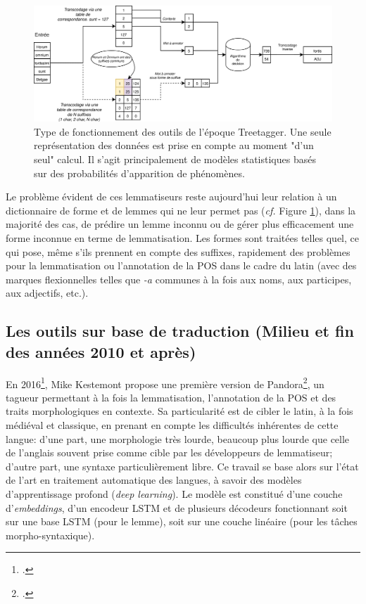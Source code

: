 \begin{figure}[h]
    \centering
    \includegraphics[width=\linewidth]{results/lemmatisation/outils/treetagger_type.png}
    \caption{Type de fonctionnement des outils de l'époque Treetagger. Une seule représentation des données est prise en compte au moment "d'un seul" calcul. Il s'agit principalement de modèles statistiques basés sur des probabilités d'apparition de phénomènes.}
    \label{lemmatisation:outils:type-treetagger}
\end{figure}

Le problème évident de ces lemmatiseurs reste aujourd'hui leur relation à un dictionnaire de forme et de lemmes qui ne leur permet pas (\textit{cf.} Figure \ref{lemmatisation:outils:type-treetagger}), dans la majorité des cas, de prédire un lemme inconnu ou de gérer plus efficacement une forme inconnue en terme de lemmatisation. Les formes sont traitées telles quel, ce qui pose, même s'ils prennent en compte des suffixes, rapidement des problèmes pour la lemmatisation ou l'annotation  de la POS dans le cadre du latin (avec des marques flexionnelles telles que \textit{-a} communes à la fois aux noms, aux participes, aux adjectifs, etc.).%

\subsection{Les outils sur base de traduction (Milieu et fin des années 2010 et après)}

En 2016\footcite{kestemont_initial_2016}, Mike Kestemont propose une première version de Pandora\footcite{kestemont_lemmatization_2017}, un tagueur permettant à la fois la lemmatisation, l'annotation de la POS et des traits morphologiques en contexte. Sa particularité est de cibler le latin, à la fois médiéval et classique, en prenant en compte les difficultés inhérentes de cette langue: d'une part, une morphologie très lourde, beaucoup plus lourde que celle de l'anglais souvent prise comme cible par les développeurs de lemmatiseur; d'autre part, une syntaxe particulièrement libre. Ce travail se base alors sur l'état de l'art en traitement automatique des langues, à savoir des modèles d'apprentissage profond (\textit{deep learning}). Le modèle est constitué d'une couche d'\textit{embeddings}, d'un encodeur LSTM et de plusieurs décodeurs fonctionnant soit sur une base LSTM (pour le lemme), soit sur une couche linéaire (pour les tâches morpho-syntaxique).


